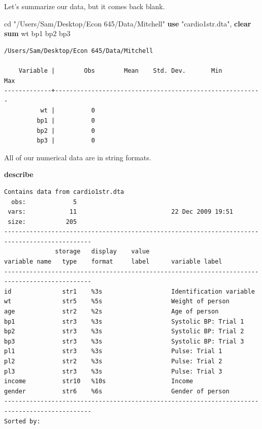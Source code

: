 \documentclass[
]{book}
\newenvironment{Shaded}{\begin{snugshade}}{\end{snugshade}}
\newcommand{\KeywordTok}[1]{\textcolor[rgb]{0.13,0.29,0.53}{\textbf{#1}}}
\newcommand{\NormalTok}[1]{#1}
\newcommand{\StringTok}[1]{\textcolor[rgb]{0.31,0.60,0.02}{#1}}
\begin{document}
Let's summarize our data, but it comes back blank.

\begin{Shaded}
\begin{Highlighting}[]
\NormalTok{cd }\StringTok{"/Users/Sam/Desktop/Econ 645/Data/Mitchell"}
\KeywordTok{use} \StringTok{"cardio1str.dta"}\NormalTok{, }\KeywordTok{clear}
\KeywordTok{sum}\NormalTok{ wt bp1 bp2 bp3}
\end{Highlighting}
\end{Shaded}

\begin{verbatim}
/Users/Sam/Desktop/Econ 645/Data/Mitchell

    Variable |        Obs        Mean    Std. Dev.       Min        Max
-------------+---------------------------------------------------------
          wt |          0
         bp1 |          0
         bp2 |          0
         bp3 |          0
\end{verbatim}

All of our numerical data are in string formats.

\begin{Shaded}
\begin{Highlighting}[]
\KeywordTok{describe}
\end{Highlighting}
\end{Shaded}

\begin{verbatim}
Contains data from cardio1str.dta
  obs:             5                          
 vars:            11                          22 Dec 2009 19:51
 size:           205                          
----------------------------------------------------------------------------------------------
              storage   display    value
variable name   type    format     label      variable label
----------------------------------------------------------------------------------------------
id              str1    %3s                   Identification variable
wt              str5    %5s                   Weight of person
age             str2    %2s                   Age of person
bp1             str3    %3s                   Systolic BP: Trial 1
bp2             str3    %3s                   Systolic BP: Trial 2
bp3             str3    %3s                   Systolic BP: Trial 3
pl1             str3    %3s                   Pulse: Trial 1
pl2             str2    %3s                   Pulse: Trial 2
pl3             str3    %3s                   Pulse: Trial 3
income          str10   %10s                  Income
gender          str6    %6s                   Gender of person
----------------------------------------------------------------------------------------------
Sorted by: 
\end{verbatim}
\end{document}
